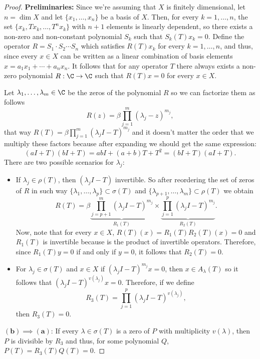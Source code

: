 \begin{proof}
    \textbf{Preliminaries:} Since we're assuming that $X$ is finitely dimensional, let $n = \dim X$ and let $\{x_1,\ldots, x_n\}$ be a basis of $X$. Then, for every $k = 1,\ldots, n$, the set $\{x_k, T x_k, \ldots, T^n x_k\}$ with $n+1$ elements is linearly dependent, so there exists a non-zero and non-constant polynomial $S_k$ such that $S_k(T)x_k = 0$. Define the operator $R = S_1 \cdot S_2 \cdots S_n$ which satisfies $R(T) x_k$ for every $k = 1,\ldots, n$, and thus, since every $x \in X$ can be written as a linear combination of basis elements $x = a_1 x_1 + \cdots + a_n x_n$. It follows that for any operator $T$ there always exists a non-zero polynomial $R:\C \to \C$ such that $R(T) x = 0$ for every $x \in X$.

    Let $\lambda_1, \ldots, \lambda_m \in \C$ be the zeros of the polynomial $R$ so we can factorize them as follows
    \[ R(z) = \beta \prod_{j = 1}^{m} (\lambda_j - z)^{m_j}, \]
    that way $R(T) = \beta \prod_{j = 1}^{m} (\lambda_j I - T )^{m_j}$ and it doesn't matter the order that we multiply these factors because after expanding we should get the same expression:
    \[ (aI+T)(bI+T) = abI + (a+b) T + T^2 = (bI+T)(aI+T). \]
    There are two possible scenarios for $\lambda_j$:
    \begin{itemize}
        \item If $\lambda_j \in \rho(T)$, then $(\lambda_j I - T)$ invertible. So after reordering the set of zeros of $R$ in such way $\{\lambda_1,\ldots,\lambda_p\} \subset \sigma(T)$ and $\{\lambda_{p+1},\ldots,\lambda_m\} \subset \rho(T)$ we obtain
        \[ R(T) = \beta \underbrace{\prod_{j = p+1}^{m} (\lambda_j I - T )^{m_j}}_{R_1(T)}\times \underbrace{\prod_{j = 1}^{p} (\lambda_j I - T )^{m_j} }_{R_2(T)}.  \]
        Now, note that for every $x\in X$, $R(T)(x) = R_1(T)R_2(T)(x) = 0$ and $R_1(T)$ is invertible because is the product of invertible operators. Therefore, since $R_1(T) y = 0$ if and only if $y = 0$, it follows that $R_2(T) = 0$.
        \item For $\lambda_j \in \sigma(T)$ and $x \in X$ if $(\lambda_j I - T )^{m_j} x = 0$, then $x \in A_\lambda(T)$ so it follows that $(\lambda_j I - T )^{v(\lambda_j)} x = 0$. Therefore, if we define
        \[ R_3(T) = \prod_{j = 1}^{p} (\lambda_j I - T )^{v(\lambda_j)}, \]
        then $R_3(T) = 0$. 
    \end{itemize}

    $\boldsymbol{(b) \implies (a)}$: If every $\lambda \in \sigma(T)$ is a zero of $P$ with multiplicity $v(\lambda)$, then $P$ is divisible by $R_3$ and thus, for some polynomial $Q$, $P(T) = R_3(T)Q(T) = 0$.


\end{proof}
